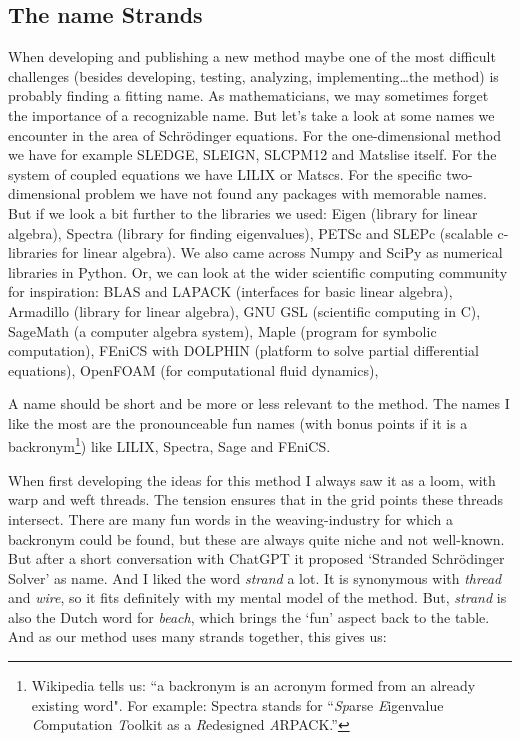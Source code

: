 \subsection{The name Strands}

When developing and publishing a new method maybe one of the most difficult challenges (besides developing, testing, analyzing, implementing\dots the method) is probably finding a fitting name. As mathematicians, we may sometimes forget the importance of a recognizable name. But let's take a look at some names we encounter in the area of Schrödinger equations. For the one-dimensional method we have for example SLEDGE, SLEIGN, SLCPM12 and Matslise itself. For the system of coupled equations we have LILIX or Matscs. For the specific two-dimensional problem we have not found any packages with memorable names. But if we look a bit further to the libraries we used: Eigen (\cpp library for linear algebra), Spectra (\cpp library for finding eigenvalues), PETSc and SLEPc (scalable c-libraries for linear algebra). We also came across Numpy and SciPy as numerical libraries in Python. Or, we can look at the wider scientific computing community for inspiration: BLAS and LAPACK (interfaces for basic linear algebra), Armadillo (\cpp library for linear algebra), GNU GSL (scientific computing in C), SageMath (a computer algebra system), Maple (program for symbolic computation), FEniCS with DOLPHIN (platform to solve partial differential equations), OpenFOAM (for computational fluid dynamics),

A name should be short and be more or less relevant to the method. The names I like the most are the pronounceable fun names (with bonus points if it is a backronym\footnote{Wikipedia tells us: ``a backronym is an acronym formed from an already existing word". For example: Spectra stands for ``\emph{Sp}arse \emph{E}igenvalue \emph{C}omputation \emph{T}oolkit as a \emph{R}edesigned \emph{A}RPACK.''}) like LILIX, Spectra, Sage and FEniCS.

When first developing the ideas for this method I always saw it as a loom, with warp and weft threads. The tension ensures that in the grid points these threads intersect. There are many fun words in the weaving-industry for which a backronym could be found, but these are always quite niche and not well-known. But after a short conversation with ChatGPT it proposed `Stranded Schrödinger Solver' as name. And I liked the word \emph{strand} a lot. It is synonymous with \emph{thread} and \emph{wire}, so it fits definitely with my mental model of the method. But, \emph{strand} is also the Dutch word for \emph{beach}, which brings the `fun' aspect back to the table. And as our method uses many strands together, this gives us:

